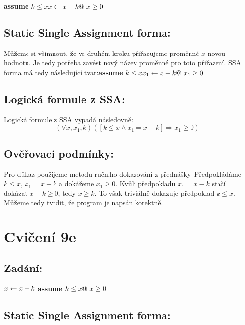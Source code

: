 \documentclass{article}
\begin{document}
\textbf{assume} $k \leq x \newline x \leftarrow x - k \newline @ \ x \geq 0$

\subsection{Static Single Assignment forma:}
Můžeme si všimnout, že ve druhém kroku přiřazujeme proměnné $x$ novou hodnotu. Je tedy potřeba zavést nový název proměnné pro toto přiřazení. SSA forma má tedy následující tvar:\newline\newline \textbf{assume} $k \leq x \newline x_1 \leftarrow x - k \newline @ \ x_1 \geq 0$

\subsection{Logická formule z SSA:}
Logická formule z SSA vypadá následovně:
$$ (\forall x, x_1, k)([k \leq x \wedge x_1 = x - k] \Rightarrow x_1 \geq 0) $$

\subsection{Ověřovací podmínky:}
Pro důkaz použijeme metodu ručního dokazování z přednášky. Předpokládáme $k \leq x$, $x_1 = x - k$ a dokážeme $x_1 \geq 0$. Kvůli předpokladu $x_1 = x - k$ stačí dokázat $x - k \geq 0$, tedy $x \geq k$. To však triviálně dokazuje předpoklad $k \leq x$. Můžeme tedy tvrdit, že program je napsán korektně.

\section{Cvičení 9e}

\subsection{Zadání:}

$x \leftarrow x - k \newline$ \textbf{assume} $k \leq x \newline @ \ x \geq 0$

\subsection{Static Single Assignment forma:}
\end{document}
